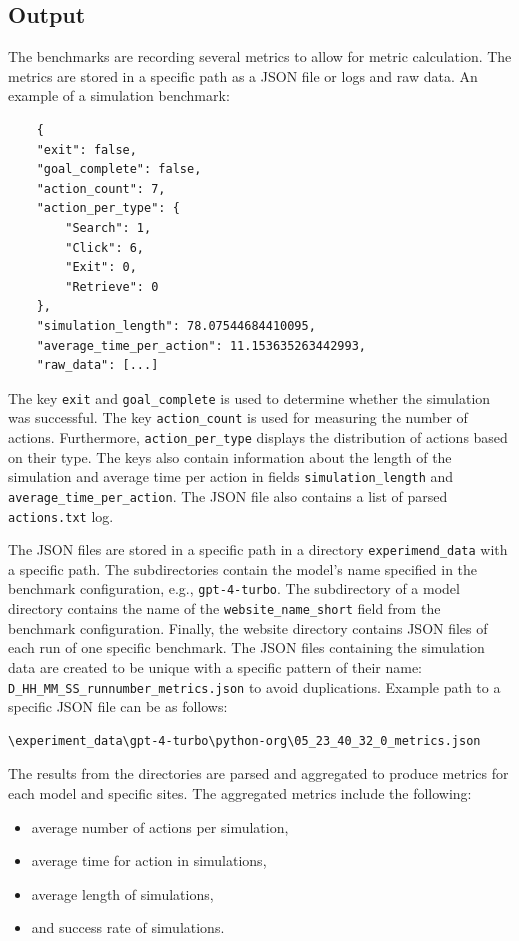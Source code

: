 \subsection{Output}

The benchmarks are recording several metrics to allow for metric calculation. The metrics are stored in a specific path as a JSON file or logs and raw data. An example of a simulation benchmark:

\begin{verbatim}
    {
    "exit": false,
    "goal_complete": false,
    "action_count": 7,
    "action_per_type": {
        "Search": 1,
        "Click": 6,
        "Exit": 0,
        "Retrieve": 0
    },
    "simulation_length": 78.07544684410095,
    "average_time_per_action": 11.153635263442993,
    "raw_data": [...]
\end{verbatim}

The key \verb|exit| and \verb|goal_complete| is used to determine whether the simulation was successful. The key \verb|action_count| is used for measuring the number of actions. Furthermore, \verb|action_per_type| displays the distribution of actions based on their type. The keys also contain information about the length of the simulation and average time per action in fields \verb|simulation_length| and \verb|average_time_per_action|. The JSON file also contains a list of parsed \verb|actions.txt| log.

The JSON files are stored in a specific path in a directory \verb|experimend_data| with a specific path. The subdirectories contain the model's name specified in the benchmark configuration, e.g., \verb|gpt-4-turbo|. The subdirectory of a model directory contains the name of the \verb|website_name_short| field from the benchmark configuration. Finally, the website directory contains JSON files of each run of one specific benchmark. The JSON files containing the simulation data are created to be unique with a specific pattern of their name: \verb|D_HH_MM_SS_runnumber_metrics.json| to avoid duplications. Example path to a specific JSON file can be as follows:

\begin{verbatim}
\experiment_data\gpt-4-turbo\python-org\05_23_40_32_0_metrics.json
\end{verbatim}

The results from the directories are parsed and aggregated to produce metrics for each model and specific sites. The aggregated metrics include the following:

\begin{itemize}
    \item average number of actions per simulation,
    \item average time for action in simulations,
    \item average length of simulations,
    \item and success rate of simulations.
\end{itemize}


